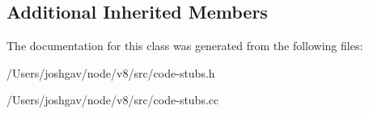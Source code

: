 \subsection*{Additional Inherited Members}


The documentation for this class was generated from the following files\+:\begin{DoxyCompactItemize}
\item 
/\+Users/joshgav/node/v8/src/code-\/stubs.\+h\item 
/\+Users/joshgav/node/v8/src/code-\/stubs.\+cc\end{DoxyCompactItemize}

